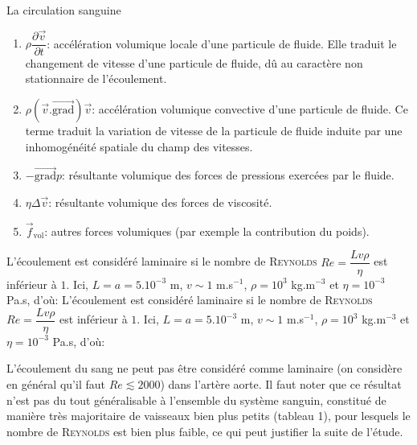 \begin{exo}[PC][1][devoir]{La circulation sanguine}
\begin{quest}
{  }
  {
  \begin{enumerate}
  \item[$\bullet$] $\rho \dfrac{\partial \overrightarrow{v}}{\partial t}$: accélération volumique locale d'une particule de fluide. Elle traduit le changement de vitesse d'une particule de fluide, dû au caractère non stationnaire de l'écoulement.
  \item[$\bullet$] $\rho \left( \overrightarrow{v}. \overrightarrow{\mathrm{grad}}\right)  \overrightarrow{v}$: accélération volumique convective d'une particule de fluide. Ce terme traduit la variation de vitesse de la particule de fluide induite par une inhomogénéité spatiale du champ des vitesses.
  \item[$\bullet$] $- \overrightarrow{\mathrm{grad}} p$: résultante volumique des forces de pressions exercées par le fluide.
  \item[$\bullet$] $\eta \Delta \overrightarrow{v}$: résultante volumique des forces de viscosité.
  \item[$\bullet$] $\overrightarrow{f}_{\mathrm{vol}}$: autres forces volumiques (par exemple la contribution du poids).
  \end{enumerate}
  }

  {L'écoulement est considéré laminaire si le nombre de \textsc{Reynolds} $Re=\dfrac{Lv\rho}{\eta}$ est inférieur à $1$. Ici, $L=a=5.10^{-3}$ m, $v \sim 1 $ m.s$^{-1}$, $\rho=10^{3}$ kg.m$^{-3}$ et $\eta=10^{-3}$ Pa.s, d'où:
  L'écoulement est considéré laminaire si le nombre de \textsc{Reynolds} $Re=\dfrac{Lv\rho}{\eta}$ est inférieur à $1$. Ici, $L=a=5.10^{-3}$ m, $v \sim 1 $ m.s$^{-1}$, $\rho=10^{3}$ kg.m$^{-3}$ et $\eta=10^{-3}$ Pa.s, d'où:

  L'écoulement du sang ne peut pas être considéré comme laminaire (on considère en général qu'il faut $Re\lesssim 2000$) dans l'artère aorte. Il faut noter que ce résultat n'est pas du tout généralisable à l'ensemble du système sanguin, constitué de manière très majoritaire de vaisseaux bien plus petits (tableau 1), pour lesquels le nombre de \textsc{Reynolds} est bien plus faible, ce qui peut justifier la suite de l'étude.

}
\end{quest}
\end{exo}
